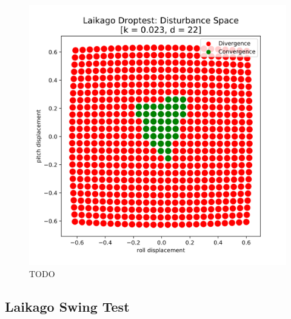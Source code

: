 \begin{figure}[h]
\begin{minipage}{0.33\textwidth}
        \end{minipage}
        \begin{minipage}{0.33\textwidth}
            \centering
            \includegraphics[width=\textwidth]{figures/droptest_ds_opt_v4.png} %
        \end{minipage}

    \caption{TODO}
    \label{fig:dropds}
    \end{figure}
    \newpage



    \subsection{Laikago Swing Test}

